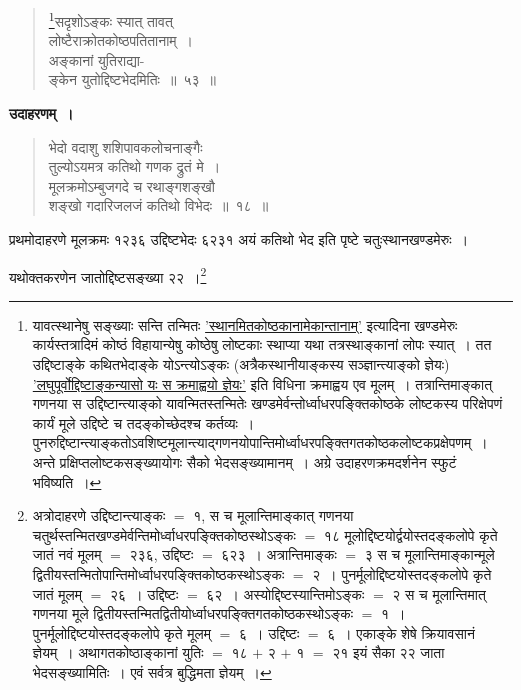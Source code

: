 \documentclass[11pt, openany]{book}
\begin{document}
\begin{quote}
\renewcommand{\thefootnote}{१}\footnote{यावत्स्थानेषु सङ्ख्याः सन्ति तन्मितः \hyperref[13.25]{'स्थानमितकोष्ठकानामेकान्तानाम्'} इत्यादिना खण्डमेरुः कार्यस्तत्रादिमं कोष्ठं विहायान्येषु कोष्ठेषु लोष्टकाः स्थाप्या यथा तत्रस्थाङ्कानां लोपः स्यात्~। तत उद्दिष्टाङ्के कथितभेदाङ्के योऽन्त्योऽङ्कः (अत्रैकस्थानीयाङ्कस्य सञ्ज्ञान्त्याङ्को ज्ञेयः) \hyperref[13.49]{'लघुपूर्वोद्दिष्टाङ्कन्यासो यः स क्रमाह्वयो ज्ञेयः'} इति विधिना क्रमाह्वय एव मूलम्~। तत्रान्तिमाङ्कात् गणनया स उद्दिष्टान्त्याङ्को यावन्मितस्तन्मितेः खण्डमेर्वन्तोर्ध्वाधरपङ्क्तिकोष्ठके लोष्टकस्य परिक्षेपणं कार्यं मूले उद्दिष्टे च तदङ्कोच्छेदश्च कर्तव्यः~। पुनरुद्दिष्टान्त्याङ्कतोऽवशिष्टमूलान्त्याद्गणनयोपान्तिमोर्ध्वाधरपङ्क्तिगतकोष्ठकलोष्टकप्रक्षेपणम्~। अन्ते प्रक्षिप्तलोष्टकसङ्ख्यायोगः सैको भेदसङ्ख्यामानम्~। अग्रे उदाहरणक्रमदर्शनेन स्फुटं भविष्यति~।}{\gk सदृशोऽङ्कः स्यात् तावत्\\
लोष्टैराक्रोतकोष्ठपतितानाम्~।\\
अङ्कानां युतिराद्या-\\
ङ्केन युतोद्दिष्टभेदमितिः~॥~५३~॥}
\end{quote}

\textbf{उदाहरणम्~।}

\begin{quote}
{\ex भेदो वदाशु शशिपावकलोचनाङ्गैः\\
तुल्योऽयमत्र कतिथो गणक द्रुतं मे~।\\
मूलक्रमोऽम्बुजगदे च रथाङ्गशङ्खौ\\
शङ्खो गदारिजलजं कतिथो विभेदः~॥~१८~॥	}
\end{quote}

प्रथमोदाहरणे मूलक्रमः १२३६ उद्दिष्टभेदः ६२३१ अयं कतिथो भेद इति पृष्टे चतुःस्थानखण्डमेरुः~।

\newpage

यथोक्तकरणेन जातोद्दिष्टसङ्ख्या २२~।\renewcommand{\thefootnote}{*}\footnote{अत्रोदाहरणे उद्दिष्टान्त्याङ्कः $=$ १, स च मूलान्तिमाङ्कात् गणनया चतुर्थस्तन्मितखण्डमेर्वन्तिमोर्ध्वाधरपङ्क्तिकोष्ठस्थोऽङ्कः $=$ १८ मूलोद्दिष्टयोर्द्वयोस्तदङ्कलोपे कृते जातं नवं मूलम् $=$ २३६, उद्दिष्टः $=$ ६२३~। अत्रान्तिमाङ्कः $=$ ३ स च मूलान्तिमाङ्कान्मूले द्वितीयस्तन्मितोपान्तिमोर्ध्वाधरपङ्क्तिकोष्ठकस्थोऽङ्कः $=$ २~। पुनर्मूलोद्दिष्टयोस्तदङ्कलोपे कृते जातं मूलम् $=$ २६~। उद्दिष्टः $=$ ६२~। अस्योद्दिष्टस्यान्तिमोऽङ्कः $=$ २ स च मूलान्तिमात् गणनया मूले द्वितीयस्तन्मितद्वितीयोर्ध्वाधरपङ्क्तिगतकोष्ठकस्थोऽङ्कः $=$ १~। पुनर्मूलोद्दिष्टयोस्तदङ्कलोपे कृते मूलम् $=$ ६~। उद्दिष्टः $=$ ६~। एकाङ्के शेषे क्रियावसानं ज्ञेयम्~। अथागतकोष्ठाङ्कानां युतिः $=$ १८ $+$ २ $+$ १ $=$ २१ इयं सैका २२ जाता भेदसङ्ख्यामितिः~। एवं सर्वत्र बुद्धिमता ज्ञेयम्~।}\\
\end{document}
